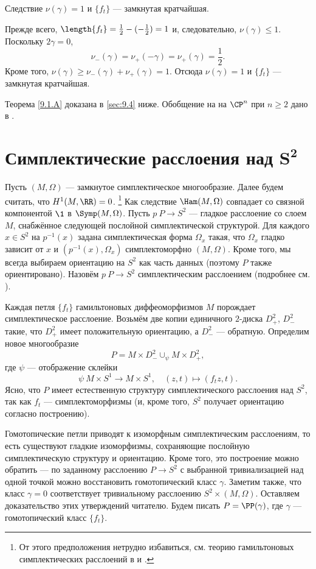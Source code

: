 \begin{thm}[(\cite{LM2})]{Следствие} $\nu(\gamma) = 1$ и $\{f_t\}$ --- замкнутая кратчайшая.
\end{thm}

Прежде всего, $\length\{f_t\} =\frac12 - (-\frac12 ) = 1$ и, следовательно, $\nu(\gamma) \le 1$.
Поскольку $2\gamma = 0$, 
\[\nu_- (\gamma) = \nu_+ (-\gamma) = \nu_+ (\gamma) =\frac12.\]
Кроме того, $\nu(\gamma) \ge \nu_- (\gamma) + \nu_+ (\gamma) = 1$.
Отсюда $\nu(\gamma) = 1$ и $\{f_t\}$ --- замкнутая кратчайшая.

Теорема \ref{9.1.A} доказана в \ref{sec:9.4} ниже.
Обобщение на на $\CP^n$ при $n \ge 2$ дано в \cite{P3}.


\section[\texorpdfstring{Симплектические расслоения над $S^2$}{Симплектические расслоения над S²}]{Симплектические расслоения над $\bm{S^2}$}

Пусть $(M, \Omega)$ --- замкнутое симплектическое многообразие.
Далее будем считать, что $H^1 (M, \RR) = 0$.%
\footnote{От этого предположения нетрудно избавиться, см. теорию гамильтоновых симплектических расслоений в \cite{MS} и \cite{P4}.}
Как следствие $\Ham(M, \Omega)$ совпадает со связной компонентой $\1$ в $\Symp(M, \Omega)$.
Пусть $p \: P \to S^2$ --- гладкое расслоение со слоем $M$, снабжённое следующей послойной симплектической структурой.
Для каждого $x \in S^2$ на $p^{-1} (x)$ задана симплектическая форма $\Omega_x$ такая, что $\Omega_x$ гладко зависит от $x$ и $(p^{-1} (x), \Omega_x)$  симплектоморфно $(M, \Omega)$.
Кроме того, мы всегда выбираем ориентацию на $S^2$ как часть данных (поэтому $P$ также ориентировано).
Назовём $p\: P\to S^2$ симплектическим расслоением (подробнее см. \cite{MS}).

Каждая петля $\{f_t\}$ гамильтоновых диффеоморфизмов $M$ порождает симплектическое расслоение.
Возьмём две копии единичного $2$-диска $D_+^2$, $D_-^2$ такие, что $D_+^2$ имеет положительную ориентацию, а $D_-^2$ --- обратную.
Определим новое многообразие
\[P =  M  \times D_-^2 \cup_\psi M \times D_+^2,\]
где $\psi$ --- отображение склейки 
\[\psi \: M \times S^1 \to M \times S^1,\quad (z, t) \mapsto (f_t z, t).\]
Ясно, что $P$ имеет естественную структуру симплектического расслоения над $S^2$, так как $f_t$ --- симплектоморфизмы (и, кроме того, $S^2$ получает ориентацию согласно построению).

Гомотопические петли приводят к изоморфным симплектическим расслоениям, то есть существуют гладкие изоморфизмы, сохраняющие послойную симплектическую структуру и ориентацию.
Кроме того, это построение можно обратить --- по заданному расслоению $P \to S^2$ с выбранной тривиализацией над одной точкой можно восстановить гомотопический класс $\gamma$.
Заметим также, что класс $\gamma = 0$ соответствует тривиальному расслоению $S^2 \times (M, \Omega)$.
Оставляем доказательство этих утверждений читателю.
Будем писать $P = \PP(\gamma)$, где $\gamma$ --- гомотопический класс $\{f_t\}$.

